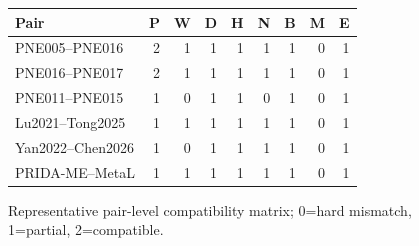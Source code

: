 \begin{figure}[H]\centering\scriptsize\begin{tabular}{lrrrrrrrr}\toprule Pair&P&W&D&H&N&B&M&E\\\midrule PNE005--PNE016&2&1&1&1&1&1&0&1\\ PNE016--PNE017&2&1&1&1&1&1&0&1\\ PNE011--PNE015&1&0&1&1&0&1&0&1\\ Lu2021--Tong2025&1&1&1&1&1&1&0&1\\ Yan2022--Chen2026&1&0&1&1&1&1&0&1\\ PRIDA-ME--MetaL&1&1&1&1&1&1&0&1\\\bottomrule\end{tabular}\caption{Representative pair-level compatibility matrix; 0=hard mismatch, 1=partial, 2=compatible.}\label{fig:c0heatmap_source}\end{figure}